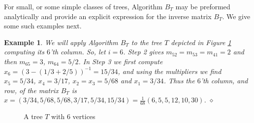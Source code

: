 \documentclass[12pt]{article}
\newtheorem{example}{Example}
\begin{document}
For small, or some simple classes of trees, Algorithm $B_T$ may be preformed analytically and provide an explicit expression for the inverse matrix $B_T$.
We give some such examples next.

\begin{example} 
{\rm 
We will apply Algorithm $B_T$ to the tree $T$ depicted in Figure \ref{tree} computing its $6$'th column. So, let $i=6$.
Step 2 gives $m_{52}=m_{53}=m_{41}=2$ and then $m_{65}=3$, $m_{64}=5/2$. In Step 3 we first compute $x_6=(3-(1/3+2/5))^{-1}=15/34$, and using the multipliers we find $x_{5}= 5/34$, $x_{4} =3/17$, $x_{2}= x_{3}=5/68$ and $x_{1} =3/34$. Thus the $6$'th column, and row,  of the matrix $B_{T}$ is $x=(3/34, 5/68, 5/68, 3/17, 5/34, 15/34)=\frac{1}{68}(6,5,5,12,10,30)$.
}\hfill{$\diamond$}
\end{example} 

\begin{figure}
\centering
\caption{A tree $T$ with $6$ vertices}
\label{tree}
\end{figure}
\end{document}
